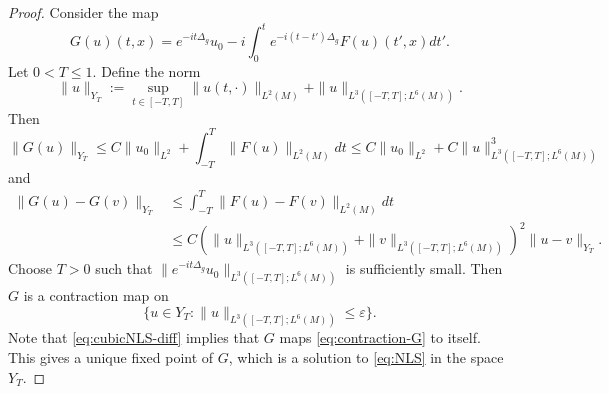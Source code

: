 \documentclass[10pt]{amsart}
\renewcommand{\epsilon}{\varepsilon}
\newcommand{\1}{{\bf 1}}
\renewcommand{\epsilon}{\varepsilon}
\begin{document}
\begin{proof}
    Consider the map
    \begin{equation*}
        G(u)(t,x)=e^{-it\Delta_g}u_0-i\int_0^t e^{-i(t-t')\Delta_g}F(u)(t',x) dt'.
    \end{equation*}
    Let $0<T\leq 1$. Define the norm 
    \begin{equation*}
        \|u\|_{Y_T}:= \sup_{t\in[-T,T]}\|u(t,\cdot)\|_{L^2(M)}+\|u\|_{L^{3}([-T,T]; L^6(M))}.
    \end{equation*}
    Then
    \begin{equation*}
        \|G(u)\|_{Y_T}\leq C\|u_0\|_{L^2}+ \int_{-T}^{T}\|F(u)\|_{L^2(M)}dt\leq C\|u_0\|_{L^2}+ C\|u\|_{L^3([-T,T];L^6(M))}^3
    \end{equation*}
    and
    \begin{equation}\label{eq:cubicNLS-diff}
    \begin{split}
        \|G(u)-G(v)\|_{Y_T}&\leq \int_{-T}^{T}\|F(u)-F(v)\|_{L^2(M)}dt\\
        &\leq C(\|u\|_{L^3([-T,T];L^6(M))}+\|v\|_{L^3([-T,T];L^6(M))})^{2}\|u-v\|_{Y_T}.
    \end{split}
    \end{equation}
    Choose $T>0$ such that $\|e^{-it\Delta_g}u_0\|_{L^3([-T,T];L^6(M))}$ is sufficiently small. Then $G$ is a contraction map on
    \begin{equation}\label{eq:contraction-G}
        \{u\in Y_T: \|u\|_{L^3([-T,T];L^6(M))}\leq \epsilon\}.
    \end{equation}
    Note that \eqref{eq:cubicNLS-diff} implies that $G$ maps \eqref{eq:contraction-G} to itself.
    This gives a unique fixed point of $G$, which is a solution to \eqref{eq:NLS} in the space $Y_T$.


\end{proof}
\end{document}
